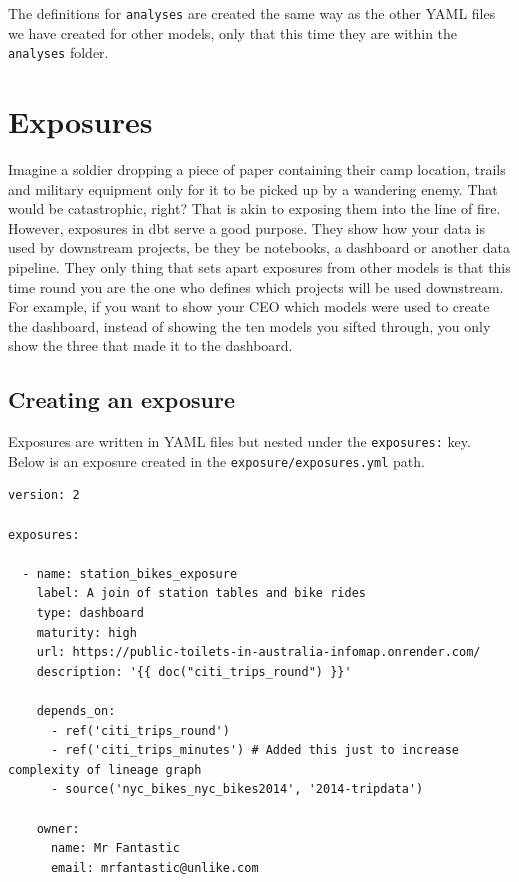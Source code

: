 \documentclass[
]{book}
\begin{document}
The definitions for \texttt{analyses} are created the same way as the other YAML files we have created for other models, only that this time they are within the \texttt{analyses} folder.

\hypertarget{exposures}{%
\chapter{Exposures}\label{exposures}}

Imagine a soldier dropping a piece of paper containing their camp location, trails and military equipment only for it to be picked up by a wandering enemy. That would be catastrophic, right? That is akin to exposing them into the line of fire. However, exposures in dbt serve a good purpose. They show how your data is used by downstream projects, be they be notebooks, a dashboard or another data pipeline. They only thing that sets apart exposures from other models is that this time round you are the one who defines which projects will be used downstream. For example, if you want to show your CEO which models were used to create the dashboard, instead of showing the ten models you sifted through, you only show the three that made it to the dashboard.

\hypertarget{creating-an-exposure}{%
\section{Creating an exposure}\label{creating-an-exposure}}

Exposures are written in YAML files but nested under the \texttt{exposures:} key. Below is an exposure created in the \texttt{exposure/exposures.yml} path.

\begin{verbatim}
version: 2

exposures:

  - name: station_bikes_exposure
    label: A join of station tables and bike rides
    type: dashboard
    maturity: high
    url: https://public-toilets-in-australia-infomap.onrender.com/
    description: '{{ doc("citi_trips_round") }}'

    depends_on:
      - ref('citi_trips_round')
      - ref('citi_trips_minutes') # Added this just to increase complexity of lineage graph
      - source('nyc_bikes_nyc_bikes2014', '2014-tripdata')

    owner:
      name: Mr Fantastic
      email: mrfantastic@unlike.com
\end{verbatim}
\end{document}
